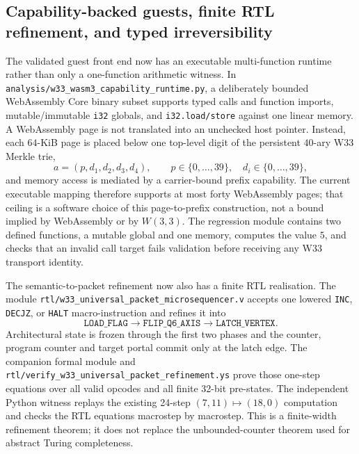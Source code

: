 \subsection{Capability-backed guests, finite RTL refinement, and typed irreversibility}

The validated guest front end now has an executable multi-function runtime rather
than only a one-function arithmetic witness.  In
\texttt{analysis/w33\_wasm3\_capability\_runtime.py}, a deliberately bounded
WebAssembly Core binary subset supports typed calls and function imports,
mutable/immutable \texttt{i32} globals, and \texttt{i32.load/store} against one
linear memory.  A WebAssembly page is not translated into an unchecked host
pointer.  Instead, each $64$-KiB page is placed below one top-level digit of the
persistent $40$-ary W33 Merkle trie,
\[
   a=(p,d_1,d_2,d_3,d_4),\qquad
   p\in\{0,\ldots,39\},\quad d_i\in\{0,\ldots,39\},
\]
and memory access is mediated by a carrier-bound prefix capability.  The
current executable mapping therefore supports at most forty WebAssembly pages;
that ceiling is a software choice of this page-to-prefix construction, not a
bound implied by WebAssembly or by $W(3,3)$.  The regression module contains two
defined functions, a mutable global and one memory, computes the value $5$, and
checks that an invalid call target fails validation before receiving any W33
transport identity.

The semantic-to-packet refinement now also has a finite RTL realisation.  The
module \texttt{rtl/w33\_universal\_packet\_microsequencer.v} accepts one lowered
\texttt{INC}, \texttt{DECJZ}, or \texttt{HALT} macro-instruction and refines it
into
\[
 \texttt{LOAD\_FLAG}\longrightarrow
 \texttt{FLIP\_Q6\_AXIS}\longrightarrow
 \texttt{LATCH\_VERTEX}.
\]
Architectural state is frozen through the first two phases and the counter,
program counter and target portal commit only at the latch edge.  The companion
formal module and \texttt{rtl/verify\_w33\_universal\_packet\_refinement.ys}
prove those one-step equations over all valid opcodes and all finite 32-bit
pre-states.  The independent Python witness replays the existing 24-step
$(7,11)\mapsto(18,0)$ computation and checks the RTL equations macrostep by
macrostep.  This is a finite-width refinement theorem; it does not replace the
unbounded-counter theorem used for abstract Turing completeness.


